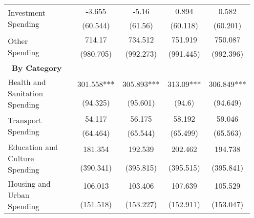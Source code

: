 \begin{table}[H]
\begin{footnotesize}
\begin{center}
{\begin{threeparttable}[b]
\begin{tabular}{rrrrrr}
    \multicolumn{1}{l}{\multirow{2}[0]{*}{Investment Spending}} &       & \multicolumn{1}{c}{-3.655} & \multicolumn{1}{c}{-5.16} & \multicolumn{1}{c}{0.894} & \multicolumn{1}{c}{0.582} \\
          &       & \multicolumn{1}{c}{(60.544)} & \multicolumn{1}{c}{(61.56)} & \multicolumn{1}{c}{(60.118)} & \multicolumn{1}{c}{(60.201)} \\
    \multicolumn{1}{l}{\multirow{2}[0]{*}{Other Spending}} &       & \multicolumn{1}{c}{714.17} & \multicolumn{1}{c}{734.512} & \multicolumn{1}{c}{751.919} & \multicolumn{1}{c}{750.087} \\
          &       & \multicolumn{1}{c}{(980.705)} & \multicolumn{1}{c}{(992.273)} & \multicolumn{1}{c}{(991.445)} & \multicolumn{1}{c}{(992.396)} \\
    \multicolumn{1}{p{17.645em}}{\textbf{By Category}} &       &       &       &       &  \\
    \multicolumn{1}{l}{\multirow{2}[0]{*}{Health and Sanitation Spending}} &       & \multicolumn{1}{c}{301.558***} & \multicolumn{1}{c}{305.893***} & \multicolumn{1}{c}{313.09***} & \multicolumn{1}{c}{306.849***} \\
          &       & \multicolumn{1}{c}{(94.325)} & \multicolumn{1}{c}{(95.601)} & \multicolumn{1}{c}{(94.6)} & \multicolumn{1}{c}{(94.649)} \\
    \multicolumn{1}{l}{\multirow{2}[0]{*}{Transport Spending}} &       & \multicolumn{1}{c}{54.117} & \multicolumn{1}{c}{56.175} & \multicolumn{1}{c}{58.192} & \multicolumn{1}{c}{59.046} \\
          &       & \multicolumn{1}{c}{(64.464)} & \multicolumn{1}{c}{(65.544)} & \multicolumn{1}{c}{(65.499)} & \multicolumn{1}{c}{(65.563)} \\
    \multicolumn{1}{l}{\multirow{2}[0]{*}{Education and Culture Spending}} &       & \multicolumn{1}{c}{181.354} & \multicolumn{1}{c}{192.539} & \multicolumn{1}{c}{202.462} & \multicolumn{1}{c}{194.738} \\
          &       & \multicolumn{1}{c}{(390.341)} & \multicolumn{1}{c}{(395.815)} & \multicolumn{1}{c}{(395.515)} & \multicolumn{1}{c}{(395.841)} \\
    \multicolumn{1}{l}{\multirow{2}[0]{*}{Housing and Urban Spending}} &       & \multicolumn{1}{c}{106.013} & \multicolumn{1}{c}{103.406} & \multicolumn{1}{c}{107.639} & \multicolumn{1}{c}{105.529} \\
          &       & \multicolumn{1}{c}{(151.518)} & \multicolumn{1}{c}{(153.227)} & \multicolumn{1}{c}{(152.911)} & \multicolumn{1}{c}{(153.047)} \\

\end{tabular}
\end{threeparttable}}
\end{center}
\end{footnotesize}
\end{table}
